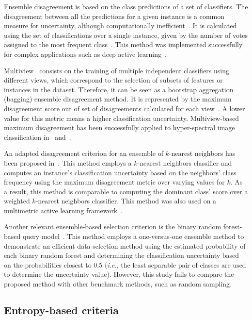 \documentclass[remotesensing,article,submit,moreauthors,pdftex]{Definitions/mdpi}
\begin{document}
Ensemble disagreement is based on the class predictions of a set of
classifiers. The disagreement between all the predictions for a given
instance is a common measure for uncertainty, although computationally
inefficient~\cite{Ruzicka2020,Pasolli2016}. It is calculated using the set of
classifications over a single instance, given by the number of votes
assigned to the most frequent class~\cite{Shrivastava2021}. This method was
implemented successfully for complex applications such as deep active
learning~\cite{Ruzicka2020}.

Multiview~\cite{Muslea2006} consists on the training of multiple independent
classifiers using different views, which correspond to the selection of subsets
of features or instances in the dataset. Therefore, it can be seen as a
bootstrap aggregation (bagging) ensemble disagreement method. It is represented
by the maximum disagreement score out of set of disagreements calculated for
each view~\cite{Shrivastava2021}. A lower value for this metric means a higher
classification uncertainty. Multiview-based maximum disagreement has been
successfully applied to hyper-spectral image classification in~\cite{Di2012}
and~\cite{Zhou2014}.

An adapted disagreement criterion for an ensemble of $k$-nearest neighbors has
been proposed in~\cite{Pasolli2016}. This method employs a $k$-nearest
neighbors classifier and computes an instance's classification uncertainty
based on the neighbors' class frequency using the maximum disagreement metric
over varying values for $k$. As a result, this method is comparable to
computing the dominant class' score over a weighted $k$-nearest neighbors
classifier. This method was also used on a multimetric active learning
framework~\cite{Zhang2016}.

Another relevant ensemble-based selection criterion is the binary random
forest-based query model~\cite{Su2020}. This method employs a one-versus-one
ensemble method to demonstrate an efficient data selection method using the
estimated probability of each binary random forest and determining the
classification uncertainty based on the probabilities closest to 0.5
(\textit{i.e.}, the least separable pair of classes are used to determine the
uncertainty value). However, this study fails to compare the proposed method
with other benchmark methods, such as random sampling.

\subsection{Entropy-based criteria}
\end{document}
